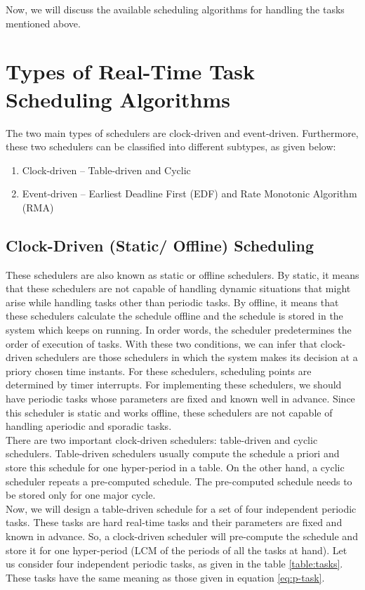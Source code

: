 \documentclass[12pt]{report}
\begin{document}
 Now, we will discuss the available scheduling algorithms for handling the tasks mentioned above. 

\section{Types of Real-Time Task Scheduling Algorithms}
The two main types of schedulers are clock-driven and event-driven. Furthermore, these two schedulers can be classified into different subtypes, as given below:
\begin{enumerate}
    \setlength\itemsep{-0.2em}
    \item Clock-driven -- Table-driven and Cyclic
    \item Event-driven -- Earliest Deadline First (EDF) and Rate Monotonic Algorithm (RMA) 
\end{enumerate}


\subsection{Clock-Driven (Static/ Offline) Scheduling}
These schedulers are also known as static or offline schedulers. By static, it means that these schedulers are not capable of handling dynamic situations that might arise while handling tasks other than periodic tasks. By offline, it means that these schedulers calculate the schedule offline and the schedule is stored in the system which keeps on running. In order words, the scheduler predetermines the order of execution of tasks. With these two conditions, we can infer that clock-driven schedulers are those schedulers in which the system makes its decision at a priory chosen time instants. For these schedulers, scheduling points are determined by timer interrupts. For implementing these schedulers, we should have periodic tasks whose parameters are fixed and known well in advance.  Since this scheduler is static and works offline, these schedulers are not capable of handling aperiodic and sporadic tasks.\\

There are two important clock-driven schedulers: table-driven and cyclic schedulers. Table-driven schedulers usually compute the schedule a priori and store this schedule for one hyper-period in a table. On the other hand, a cyclic scheduler repeats a pre-computed schedule. The pre-computed schedule needs to be stored only for one major cycle.  \\

Now, we will design a table-driven schedule for a set of four independent periodic tasks. These tasks are hard real-time tasks and their parameters are fixed and known in advance. So, a clock-driven scheduler will pre-compute the schedule and store it for one hyper-period (LCM of the periods of all the tasks at hand). Let us consider four independent periodic tasks, as given in the table \ref{table:tasks}. These tasks have the same meaning as those given in equation \ref{eq:p-task}. 
\end{document}
